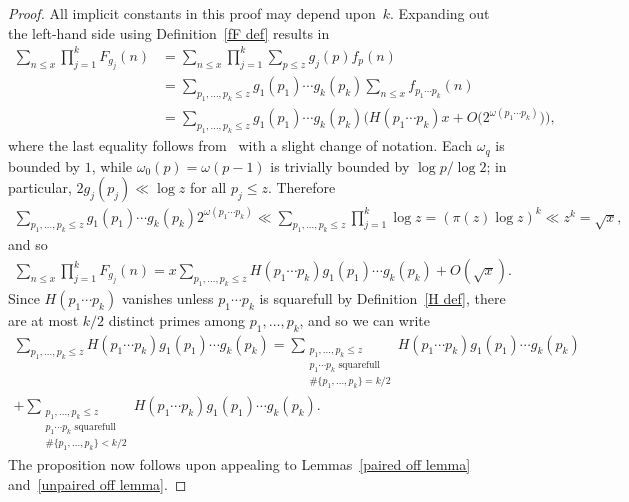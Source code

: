 \documentclass[12pt,reqno]{amsart}
\theoremstyle{definition}
\begin{document}

\begin{proof}
All implicit constants in this proof may depend upon~$k$.
Expanding out the left-hand side using Definition~\ref{fF def} results in
\begin{align*}
\sum_{n \leq x} \prod_{j=1}^k F_{g_j}(n) &= \sum_{n \leq x} \prod_{j=1}^k \sum_{p\leq z} g_j(p)f_p(n) \\
&= \sum_{p_1,\dots,p_k \leq z} g_1(p_1) \cdots g_k(p_k) \sum_{n \leq x} f_{p_1\cdots p_k}(n) \\
&= \sum_{p_1,\dots,p_k \leq z} g_1(p_1) \cdots g_k(p_k) \big( H(p_1\cdots p_k)x + O\big( 2^{\omega(p_1\cdots p_k)} \big) \big),
\end{align*}
where the last equality follows from~\cite[equation before equation~(9)]{gs07} with a slight change of notation.
Each $\omega_q$ is bounded by $1$, while $\omega_0(p) = \omega(p-1)$ is trivially bounded by $\log p/\log 2$; in particular, $2g_j(p_j) \ll \log z$ for all $p_j \le z$. Therefore
\begin{align*}
\sum_{p_1,\dots,p_k \leq z} g_1(p_1) \cdots g_k(p_k) 2^{\omega(p_1\cdots p_k)} \ll \sum_{p_1,\dots,p_k \leq z} \prod_{j=1}^k \log z = (\pi(z)\log z)^k \ll z^k = \sqrt x,
\end{align*}
and so
\begin{align*}
\sum_{n \leq x} \prod_{j=1}^k F_{g_j}(n) = x \sum_{p_1,\dots,p_k \leq z} H(p_1\cdots p_k) g_1(p_1) \cdots g_k(p_k) + O(\sqrt x).
\end{align*}
Since $H(p_1\cdots p_k)$ vanishes unless $p_1\cdots p_k$ is squarefull by Definition~\ref{H def}, there are at most $k/2$ distinct primes among $p_1,\dots,p_k$, and so we can write
\begin{multline*}
\sum_{p_1,\dots,p_k \leq z} H(p_1\cdots p_k) g_1(p_1) \cdots g_k(p_k) = \sum_{\substack{p_1,\dots,p_k \leq z \\ p_1\cdots p_k \text{ squarefull} \\ \#\{p_1,\dots,p_k\} = k/2}} H(p_1\cdots p_k) g_1(p_1) \cdots g_k(p_k) \\
+ \sum_{\substack{p_1,\dots,p_k \leq z \\ p_1\cdots p_k \text{ squarefull} \\ \#\{p_1,\dots,p_k\} < k/2}} H(p_1\cdots p_k) g_1(p_1) \cdots g_k(p_k).
\end{multline*}
The proposition now follows upon appealing to Lemmas~\ref{paired off lemma} and~\ref{unpaired off lemma}.
\end{proof}
\end{document}
